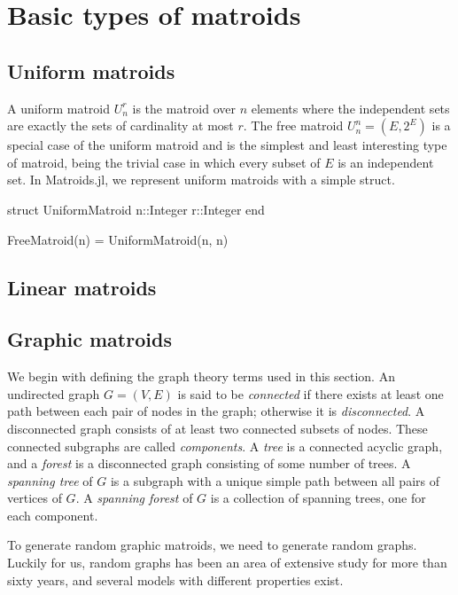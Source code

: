 \section{Basic types of matroids}
\skelpar

\subsection{Uniform matroids}
A uniform matroid $U_n^r$ is the matroid over $n$ elements where the independent sets are exactly the sets of cardinality at most $r$. The free matroid $U_n^n = (E, 2^E)$ is a special case of the uniform matroid and is the simplest and least interesting type of matroid, being the trivial case in which every subset of $E$ is an independent set. In Matroids.jl, we represent uniform matroids with a simple struct.

\begin{jllisting}
struct UniformMatroid
  n::Integer
  r::Integer
end

FreeMatroid(n) = UniformMatroid(n, n)
\end{jllisting}

\subsection{Linear matroids}

\subsection{Graphic matroids}

We begin with defining the graph theory terms used in this section. An undirected graph $G=(V,E)$ is said to be \textit{connected} if there exists at least one path between each pair of nodes in the graph; otherwise it is \textit{disconnected}. A disconnected graph consists of at least two connected subsets of nodes. These connected subgraphs are called \textit{components}. A \textit{tree} is a connected acyclic graph, and a \textit{forest} is a disconnected graph consisting of some number of trees. A \textit{spanning tree} of $G$ is a subgraph with a unique simple path between all pairs of vertices of $G$. A \textit{spanning forest} of $G$ is a collection of spanning trees, one for each component.

To generate random graphic matroids, we need to generate random graphs. Luckily for us, random graphs has been an area of extensive study for more than sixty years, and several models with different properties exist.

